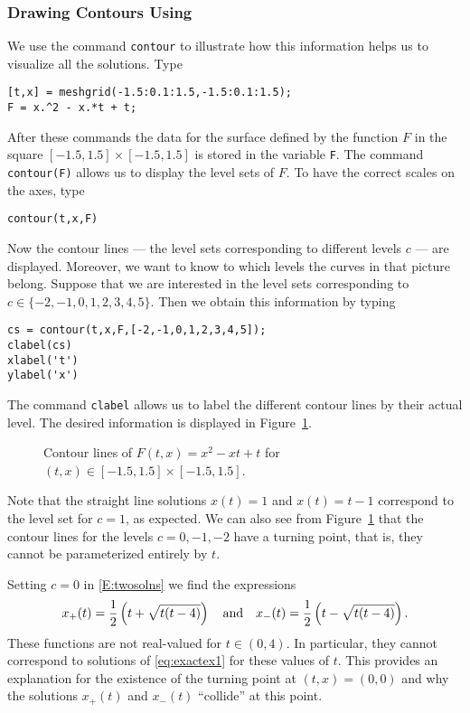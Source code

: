 \documentclass{ximera}
\begin{document}
\subsubsection*{Drawing Contours Using \Matlab}

We use the \Matlab command {\tt contour} to illustrate how this
information helps us to visualize all the solutions.  Type
\begin{verbatim}
[t,x] = meshgrid(-1.5:0.1:1.5,-1.5:0.1:1.5);
F = x.^2 - x.*t + t;
\end{verbatim}
After these commands the data for the surface defined by the
function $F$ in the square $[-1.5,1.5]\times [-1.5,1.5]$ is
stored in the \Matlab variable {\tt F}.  The command {\tt
contour(F)} allows us to display 
the level sets of $F$.  To have
the correct scales on the axes, type
\begin{verbatim}
contour(t,x,F)
\end{verbatim}
Now the contour lines --- the level sets corresponding to
different levels $c$ --- are displayed.  Moreover, we want to know to which 
levels the curves in that picture belong.  Suppose that we are interested in 
the level sets corresponding to $c\in\{ -2,-1,0,1,2,3,4,5\}$.  Then we 
obtain this information by typing
\begin{verbatim}
cs = contour(t,x,F,[-2,-1,0,1,2,3,4,5]);
clabel(cs)
xlabel('t')
ylabel('x')
\end{verbatim}
The command {\tt clabel} allows us to label the different
contour lines by their actual level.  The desired
information is displayed in Figure~\ref{Fig:contour1}.

\begin{figure}[htb]
           \centerline{%
           }
           \caption{Contour lines of $F(t,x)=x^2-xt+t$ for
          $(t,x)\in[-1.5,1.5]\times[-1.5,1.5]$.}
           \label{Fig:contour1}
\end{figure}

Note that the straight line solutions $x(t)=1$ and $x(t)=t-1$ 
correspond to the level set for $c=1$, as expected.  We can also
see from Figure~\ref{Fig:contour1} that the contour lines for
the levels $c=0,-1,-2$ have a turning point, that is, they
cannot be parameterized entirely by $t$.  

Setting $c=0$ in \eqref{E:twosolns} we find the expressions
\[
x_+(t) = \frac{1}{2}\left(t+\sqrt{t(t-4)}\right) \quad\mbox{and}\quad
x_-(t) = \frac{1}{2}\left(t-\sqrt{t(t-4)}\right).
\]
These functions are not real-valued for $t\in (0,4)$.  In
particular, they cannot correspond to solutions of
\eqref{eq:exactex1} for these values of $t$.  This provides
an explanation for the existence of the turning point at
$(t,x)=(0,0)$ and why the solutions $x_+(t)$ and $x_-(t)$
``collide'' at this point.
\end{document}
